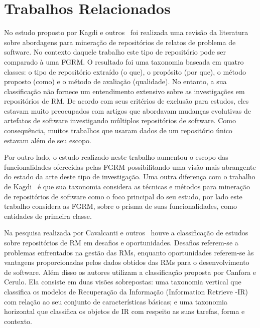 

\section{Trabalhos Relacionados}
\label{sec:map_trabalhos_relacionados}

No estudo proposto por Kagdi e outros~\cite{kagdi2012assigning} foi realizada
uma revisão da literatura sobre abordagens para mi\-ne\-ra\-ção de repositórios de
relatos de problema de software. No contexto daquele trabalho este tipo de
repositório pode ser comparado à uma FGRM\@. O resultado foi uma taxonomia
baseada em quatro classes: o tipo de repositório extraído (o que), o propósito
(por que), o método proposto (como) e o método de avaliação (qualidade). No
entanto, a sua classificação não fornece um entendimento extensivo sobre as
investigações em repositórios de RM\@. De acordo com seus critérios de exclusão
para estudos, eles estavam muito preocupados com artigos que abordavam mudanças
evolutivas de artefatos de software investigando múltiplos repositórios de
software. Como consequência, muitos trabalhos que usaram dados de um repositório
único estavam além de seu escopo.

Por outro lado, o estudo realizado neste trabalho aumentou o escopo das
funcionalidades oferecidas pelas FGRM possibilitando uma visão mais abrangente
do estado da arte deste tipo de investigação. Uma outra diferença com o trabalho
de Kagdi~\cite{kagdi2012assigning} é que sua taxonomia considera as técnicas e
métodos para mineração de repositórios de software como o foco principal do seu
estudo, por lado este trabalho considera as FGRM, sobre o prisma de suas
funcionalidades, como entidades de primeira classe.

Na pesquisa realizada por Cavalcanti e outros~\cite{cavalcanti2014challenges}
houve a classificação de estudos sobre repositórios de RM em desafios e
oportunidades. Desafios referem-se a problemas enfrentados na gestão das RMs,
enquanto oportunidades referem-se às vantagens proporcionadas pelos dados
obtidos das  RMs para o desenvolvimento de software. Além disso os autores
utilizam a classificação proposta por Canfora e Cerulo\cite{cerulo2004taxonomy}.
Ela consiste em duas visões sobrepostas: uma taxonomia vertical que classifica
os modelos de Recuperação da Informação (Information Retrieve \@-\@ IR) com
relação ao seu conjunto de características básicas; e uma taxonomia horizontal
que classifica os objetos de IR com respeito as suas tarefas, forma e contexto.


